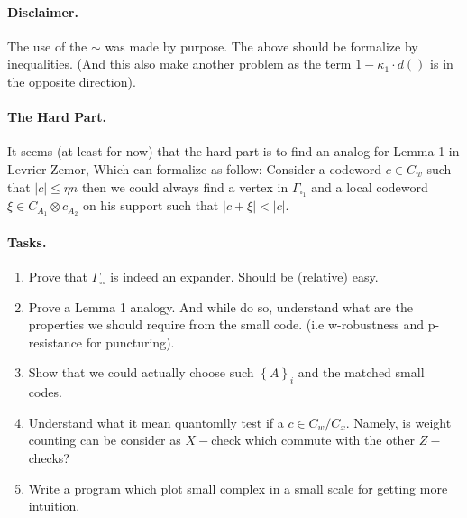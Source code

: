 \documentclass{article}
\begin{document}
\begin{multicols*}{2}
	\paragraph{Disclaimer.} The use of the $\sim$ was  made by purpose. The above should be formalize by inequalities. (And this also make another problem as 
	the term $ 1 - \kappa_{1} \cdot d\left(  \right) $ is in the opposite direction). 
	\paragraph{The Hard Part.} It seems (at least for now) that the hard part is to find an analog for Lemma 1 in Levrier-Zemor, Which can formalize 
	as follow: Consider a codeword $c \in C_{w}$ such that $|c| \le \eta n $ then we could always find a vertex in $\Gamma_{\square_{1}} $
	and a local codeword $\xi \in C_{A_1} \otimes c_{A_2} $ on his support such that $|c + \xi| < |c| $.     
      

	\paragraph{Tasks.}
	\begin{enumerate}
	  \item Prove that $\Gamma_{\square \square } $ is indeed an expander. Should be (relative) easy.
	  \item Prove a Lemma 1 analogy. And while do so, understand what are the properties we should require from the small code.
	    (i.e w-robustness and p-resistance for puncturing). 
	  \item Show that we could actually choose such $\left\{ A \right\}_{i}$ and the matched small codes.
	  \item Understand what it mean quantomlly test if a $c \in C_{w}/ C_{x}$. Namely, is weight counting can be consider as 
	    $X-$check which commute with the other $Z-$checks? 
	  \item Write a program which plot small complex in a small scale for getting more intuition. 
	\end{enumerate}
\end{multicols*}
\end{document}
